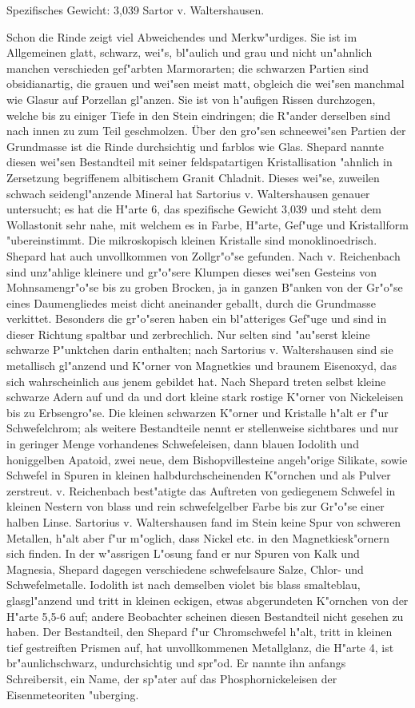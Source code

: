 \documentclass[a4paper, 11pt, oneside]{article}
\begin{document}
Spezifisches Gewicht: 3,039 Sartor v. Waltershausen.

Schon die Rinde zeigt viel Abweichendes und Merkw"urdiges. Sie ist im Allgemeinen glatt, schwarz, wei"s, bl"aulich und grau und nicht un"ahnlich manchen verschieden gef"arbten Marmorarten; die schwarzen Partien sind obsidianartig, die grauen und wei"sen meist matt, obgleich die wei"sen manchmal wie Glasur auf Porzellan gl"anzen. Sie ist von h"aufigen Rissen durchzogen, welche bis zu einiger Tiefe in den Stein eindringen; die R"ander derselben sind nach innen zu zum Teil geschmolzen. Über den gro"sen schneewei"sen Partien der Grundmasse ist die Rinde durchsichtig und farblos wie Glas. Shepard nannte diesen wei"sen Bestandteil mit seiner feldspatartigen Kristallisation "ahnlich in Zersetzung begriffenem albitischem Granit Chladnit. Dieses wei"se, zuweilen schwach seidengl"anzende Mineral hat Sartorius v. Waltershausen genauer untersucht; es hat die H"arte 6, das spezifische Gewicht 3,039 und steht dem Wollastonit sehr nahe, mit welchem es in Farbe, H"arte, Gef"uge und Kristallform "ubereinstimmt. Die mikroskopisch kleinen Kristalle sind monoklinoedrisch. Shepard hat auch unvollkommen von Zollgr"o"se gefunden. Nach v. Reichenbach sind unz"ahlige kleinere und gr"o"sere Klumpen dieses wei"sen Gesteins von Mohnsamengr"o"se bis zu groben Brocken, ja in ganzen B"anken von der Gr"o"se eines Daumengliedes meist dicht aneinander geballt, durch die Grundmasse verkittet. Besonders die gr"o"seren haben ein bl"atteriges Gef"uge und sind in dieser Richtung spaltbar und zerbrechlich. Nur selten sind "au"serst kleine schwarze P"unktchen darin enthalten; nach Sartorius v. Waltershausen sind sie metallisch gl"anzend und K"orner von Magnetkies und braunem Eisenoxyd, das sich wahrscheinlich aus jenem gebildet hat. Nach Shepard treten selbst kleine schwarze Adern auf und da und dort kleine stark rostige K"orner von Nickeleisen bis zu Erbsengro"se. Die kleinen schwarzen K"orner und Kristalle h"alt er f"ur Schwefelchrom; als weitere Bestandteile nennt er stellenweise sichtbares und nur in geringer Menge vorhandenes Schwefeleisen, dann blauen Iodolith und honiggelben Apatoid, zwei neue, dem Bishopvillesteine angeh"orige Silikate, sowie Schwefel in Spuren in kleinen halbdurchscheinenden K"ornchen und als Pulver zerstreut. v. Reichenbach best"atigte das Auftreten von gediegenem Schwefel in kleinen Nestern von blass und rein schwefelgelber Farbe bis zur Gr"o"se einer halben Linse. Sartorius v. Waltershausen fand im Stein keine Spur von schweren Metallen, h"alt aber f"ur m"oglich, dass Nickel etc. in den Magnetkiesk"ornern sich finden. In der w"assrigen L"osung fand er nur Spuren von Kalk und Magnesia, Shepard dagegen verschiedene schwefelsaure Salze, Chlor- und Schwefelmetalle. Iodolith ist nach demselben violet bis blass smalteblau, glasgl"anzend und tritt in kleinen eckigen, etwas abgerundeten K"ornchen von der H"arte 5,5-6 auf; andere Beobachter scheinen diesen Bestandteil nicht gesehen zu haben. Der Bestandteil, den Shepard f"ur Chromschwefel h"alt, tritt in kleinen tief gestreiften Prismen auf, hat unvollkommenen Metallglanz, die H"arte 4, ist br"aunlichschwarz, undurchsichtig und spr"od. Er nannte ihn anfangs Schreibersit, ein Name, der sp"ater auf das Phosphornickeleisen der Eisenmeteoriten "uberging.
\end{document}
